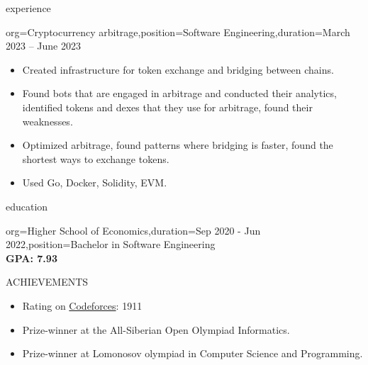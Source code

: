 \documentclass{resume}
\begin{document}
\begin{ResumeSection}{experience}
\begin{ResumeSubsection}{org=Cryptocurrency arbitrage,position={Software Engineering},duration=March 2023 – June 2023}
\begin{itemize}
            \item {
                Created infrastructure for token exchange and bridging between chains.
            }

            \item {
                Found bots that are engaged in arbitrage and conducted their analytics, identified tokens and dexes that they use for arbitrage, found their weaknesses.
            }

            \item {
                Optimized arbitrage, found patterns where bridging is faster, found the shortest ways to exchange tokens.
            }

            \item {
                Used Go, Docker, Solidity, EVM.
            }
        \end{itemize}
    \end{ResumeSubsection}
\end{ResumeSection}

\begin{ResumeSection}{education}
    \begin{ResumeSubsection}{org={Higher School of Economics},duration={Sep 2020 - Jun 2022},position={Bachelor in Software Engineering}}
        \\\bf GPA: 7.93 
    \end{ResumeSubsection}
\end{ResumeSection}

\begin{ResumeSection}{ACHIEVEMENTS}
    \begin{itemize}
        \item Rating on \href{https://codeforces.com/profile/nikita4109}{Codeforces}: 1911
        \item Prize-winner at the All-Siberian Open Olympiad Informatics. 
        \item Prize-winner at Lomonosov olympiad in Computer Science and Programming.
    \end{itemize}
\end{ResumeSection}
\end{document}
